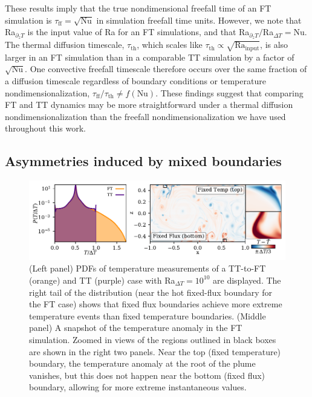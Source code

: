 \documentclass[aps, pre, onecolumn, nofootinbib, notitlepage, groupedaddress, amsfonts, amssymb, amsmath, longbibliography, superscriptaddress]{revtex4-1}
\begin{document}
These results imply that the true nondimensional freefall time of an FT simulation is $\tau_{\text{ff}} = \sqrt{\text{Nu}}$ in simulation freefall time units.
However, we note that Ra$_{\partial_z T}$ is the input value of Ra for an FT simulations, and that Ra$_{\partial_z T}/$Ra$_{\Delta T} = \text{Nu}$.
The thermal diffusion timescale, $\tau_{\text{th}}$, which scales like $\tau_{\text{th}} \propto \sqrt{\text{Ra}_{\text{input}}}$, is also larger in an FT simulation than in a comparable TT simulation by a factor of $\sqrt{\text{Nu}}$.
One convective freefall timescale therefore occurs over the same fraction of a diffusion timescale regardless of boundary conditions or temperature nondimensionalization, $\tau_{\text{ff}}/\tau_{\text{th}} \neq f(\text{Nu})$.
These findings suggest that comparing FT and TT dynamics may be more straightforward under a thermal diffusion nondimensionalization \cite{goluskin2016} than the freefall nondimensionalization we have used throughout this work.

\subsection{Asymmetries induced by mixed boundaries}
\label{sec:asymmetries}

\begin{figure}
\includegraphics[width=\textwidth]{./figs/rbc_dynamics_asymmetries.pdf}
\caption{ 
	(Left panel) PDFs of temperature measurements of a TT-to-FT (orange) and TT (purple) case with Ra$_{\Delta T} = 10^{10}$ are displayed.
	The right tail of the distribution (near the hot fixed-flux boundary for the FT case) shows that fixed flux boundaries achieve more extreme temperature events than fixed temperature boundaries.
	(Middle panel) A snapshot of the temperature anomaly in the FT simulation.
	Zoomed in views of the regions outlined in black boxes are shown in the right two panels.
	Near the top (fixed temperature) boundary, the temperature anomaly at the root of the plume vanishes, but this does not happen near the bottom (fixed flux) boundary, allowing for more extreme instantaneous values.
\label{fig:rbc_dynamics_asymmetries} }
\end{figure}
\end{document}
